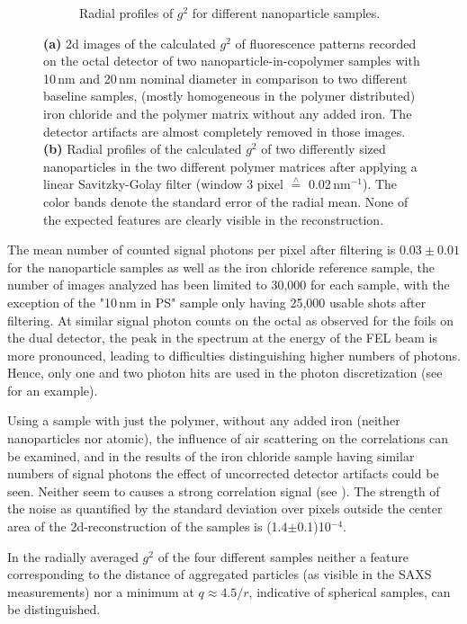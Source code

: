 \begin{figure}
\begin{subfigure}[b]{\textwidth}
\begin{subfigure}[b]{0.49\textwidth}
	\end{subfigure}
			\caption{Radial profiles of $g^2$ for different nanoparticle samples.}
			\end{subfigure}
	\label{fig:resnanorad}
	\caption[Results nanoparticles]{\textbf{(a)} 2d images of the calculated $g^2$ of fluorescence patterns recorded on the octal detector of two nanoparticle-in-copolymer samples with 10\,nm and 20\,nm nominal diameter in comparison to two different baseline samples, (mostly homogeneous in the polymer distributed) iron chloride and the polymer matrix without any added iron. The detector artifacts are almost completely removed in those images. \textbf{(b)} Radial profiles of the calculated $g^2$ of two differently sized nanoparticles in the two different polymer matrices after applying a linear Savitzky-Golay filter (window 3 pixel $\overset{\scriptscriptstyle\wedge}{=}$ 0.02\,nm$^{-1}$). The color bands denote the standard error of the radial mean. None of the expected features are clearly visible in the reconstruction. }
	\label{fig:resnano}
\end{figure}

The mean number of counted signal photons per pixel after filtering is $0.03\pm0.01$ for the nanoparticle samples as well as the iron chloride reference sample, the number of images analyzed has been limited to 30,000 for each sample, with the exception of the "10\,nm in PS" sample only having 25,000 usable shots after filtering. At similar signal photon counts on the octal as observed for the foils on the dual detector, the peak in the spectrum at the energy of the FEL beam is more pronounced, leading to difficulties distinguishing higher numbers of photons. Hence, only one and two photon hits are used in the photon discretization (see  for an example).

Using a sample with just the polymer, without any added iron (neither nanoparticles nor atomic), the influence of air scattering on the correlations can be examined, and in the results of the iron chloride sample having similar numbers of signal photons the effect of uncorrected detector artifacts could be seen. Neither seem to causes a strong correlation signal (see ). The strength of the noise as quantified by the standard deviation over pixels outside the center area of the 2d-reconstruction of the samples is (1.4$\pm$0.1)10$^{-4}$.

In the radially averaged $g^2$ of the four different samples neither a feature corresponding to the distance of aggregated particles (as visible in the SAXS measurements)  nor a minimum at $q\approx4.5/r$, indicative of spherical samples, can be distinguished. 
\FloatBarrier
